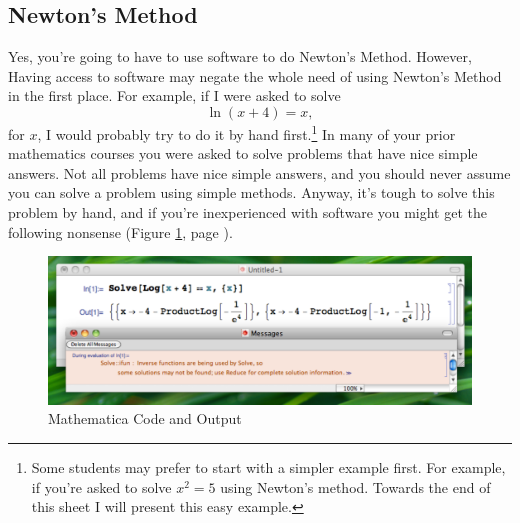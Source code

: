 \documentclass[12pt,addpoints, answers, fleqn]{exam}
\begin{document}
\subsection{Newton's Method}
Yes, you're going to have to use software to do Newton's Method. However, Having access to software may negate the whole need of using Newton's Method in the first place. For example, if I were asked to solve
\[
\ln \left( x + 4 \right) = x,
\]
for $x$, I would probably try to do it by hand first.\footnote{Some students may prefer to start with a simpler example first. For example, if you're asked to solve $x^2=5$ using Newton's method. Towards the end of this sheet I will present this easy example.} In many of your prior mathematics courses you were asked to solve problems that have nice simple answers. Not all problems have nice simple answers, and you should never assume you can solve a problem using simple methods. Anyway, it's tough to solve this problem by hand, and if you're inexperienced with software you might get the following nonsense (Figure \ref{fig:image2501}, page \pageref{fig:image2501}).
\begin{figure}[htbp] %
   \centering
   \includegraphics[width=6in]{./graphics/image2501.pdf} 
   \caption{Mathematica Code and Output}
   \label{fig:image2501}
\end{figure}
\end{document}
